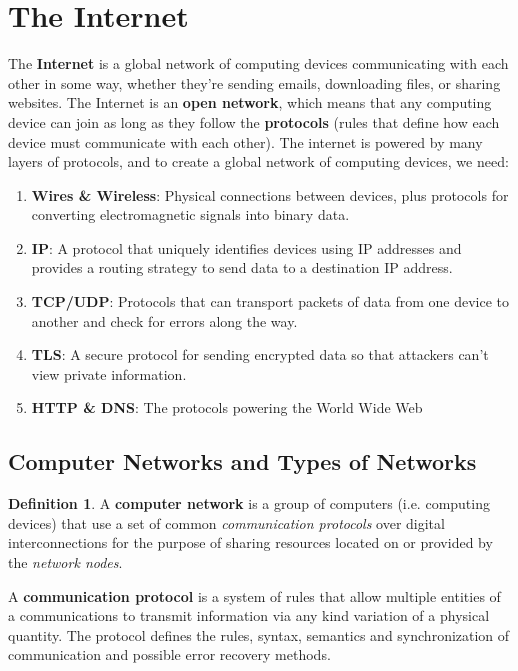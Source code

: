\documentclass[a4paper, 12pt]{report}
\theoremstyle{remark}
\theoremstyle{definition}
\newtheorem{definition}{Definition}[section]
\begin{document}
\section{The Internet}
The \textbf{Internet} is a global network of computing devices communicating with each other in some way, whether they're sending emails, downloading files, or sharing websites. The Internet is an \textbf{open network}, which means that any computing device can join as long as they follow the \textbf{protocols} (rules that define how each device must communicate with each other). The internet is powered by many layers of protocols, and to create a global network of computing devices, we need: 
\begin{enumerate}
    \item \textbf{Wires \& Wireless}: Physical connections between devices, plus protocols for converting electromagnetic signals into binary data. 
    \item \textbf{IP}: A protocol that uniquely identifies devices using IP addresses and provides a routing strategy to send data to a destination IP address. 
    \item \textbf{TCP/UDP}: Protocols that can transport packets of data from one device to another and check for errors along the way. 
    \item \textbf{TLS}: A secure protocol for sending encrypted data so that attackers can't view private information. 
    \item \textbf{HTTP \& DNS}: The protocols powering the World Wide Web
\end{enumerate}

\subsection{Computer Networks and Types of Networks}

\begin{definition}
A \textbf{computer network} is a group of computers (i.e. computing devices) that use a set of common \textit{communication protocols} over digital interconnections for the purpose of sharing resources located on or provided by the \textit{network nodes}. 

A \textbf{communication protocol} is a system of rules that allow multiple entities of a communications to transmit information via any kind variation of a physical quantity. The protocol defines the rules, syntax, semantics and synchronization of communication and possible error recovery methods. 
\end{definition}
\end{document}
